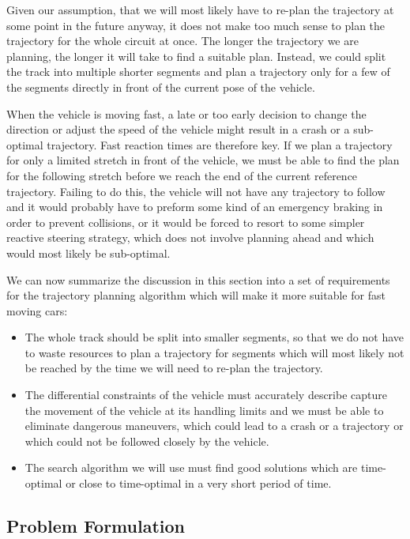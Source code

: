 Given our assumption, that we will most likely have to re-plan the trajectory at some point in the future anyway, it does not make too much sense to plan the trajectory for the whole circuit at once. The longer the trajectory we are planning, the longer it will take to find a suitable plan. Instead, we could split the track into multiple shorter segments and plan a trajectory only for a few of the segments directly in front of the current pose of the vehicle.

When the vehicle is moving fast, a late or too early decision to change the direction or adjust the speed of the vehicle might result in a crash or a sub-optimal trajectory. Fast reaction times are therefore key. If we plan a trajectory for only a limited stretch in front of the vehicle, we must be able to find the plan for the following stretch before we reach the end of the current reference trajectory. Failing to do this, the vehicle will not have any trajectory to follow and it would probably have to preform some kind of an emergency braking in order to prevent collisions, or it would be forced to resort to some simpler reactive steering strategy, which does not involve planning ahead and which would most likely be sub-optimal.

We can now summarize the discussion in this section into a set of requirements for the trajectory planning algorithm which will make it more suitable for fast moving cars:

\begin{itemize}
	\item The whole track should be split into smaller segments, so that we do not have to waste resources to plan a trajectory for segments which will most likely not be reached by the time we will need to re-plan the trajectory.
	\item The differential constraints of the vehicle must accurately describe capture the movement of the vehicle at its handling limits and we must be able to eliminate dangerous maneuvers, which could lead to a crash or a trajectory or which could not be followed closely by the vehicle.
	\item The search algorithm we will use must find good solutions which are time-optimal or close to time-optimal in a very short period of time.
\end{itemize}

\subsection{Problem Formulation}

